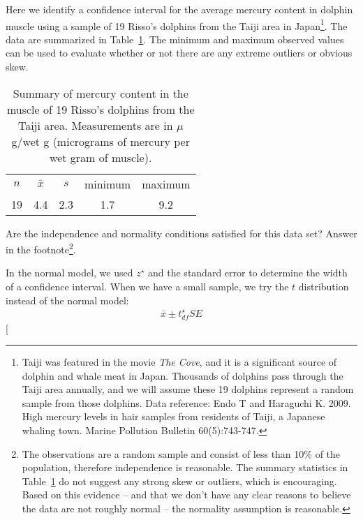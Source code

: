 Here we identify a confidence interval for the average mercury content in dolphin muscle using a sample of 19 Risso's dolphins from the Taiji area in Japan\footnote{Taiji was featured in the movie \emph{The Cove}, and it is a significant source of dolphin and whale meat in Japan. Thousands of dolphins pass through the Taiji area annually, and we will assume these 19 dolphins represent a random sample from those dolphins. Data reference: Endo T and Haraguchi K. 2009. High mercury levels in hair samples from residents of Taiji, a Japanese whaling town. Marine Pollution Bulletin 60(5):743-747.}. The data are summarized in Table~\ref{summaryStatsOfHgInMuscleOfRissosDolphins}. The minimum and maximum observed values can be used to evaluate whether or not there are any extreme outliers or obvious skew.
\begin{table}[h]
\centering
\begin{tabular}{ccc cc}
\hline
$n$ & $\bar{x}$ & $s$ & minimum & maximum \\
19   & 4.4	  & 2.3  & 1.7	       & 9.2 \\
\hline
\end{tabular}
\caption{Summary of mercury content in the muscle of 19 Risso's dolphins from the Taiji area. Measurements are in $\mu$g/wet g (micrograms of mercury per wet gram of muscle).}
\label{summaryStatsOfHgInMuscleOfRissosDolphins}
\end{table}

\begin{exercise}
Are the independence and normality conditions satisfied for this data set? Answer in the footnote\footnote{The observations are a random sample and consist of less than 10\% of the population, therefore independence is reasonable. The summary statistics in Table~\ref{summaryStatsOfHgInMuscleOfRissosDolphins} do not suggest any strong skew or outliers, which is encouraging. Based on this evidence -- and that we don't have any clear reasons to believe the data are not roughly normal -- the normality assumption is reasonable.}.
\end{exercise}

In the normal model, we used $z^{\star}$ and the standard error to determine the width of a confidence interval. When we have a small sample, we try the $t$ distribution instead of the normal model:
\begin{eqnarray*}
\bar{x} \pm t^{\star}_{df}SE
\end{eqnarray*}
\marginpar[\raggedright\vspace{-9mm}

